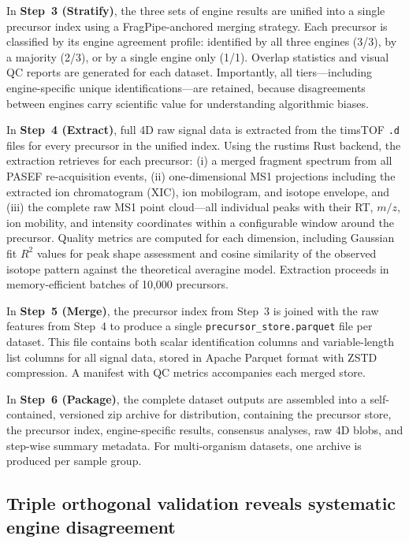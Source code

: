 \documentclass[10pt,twoside]{article}
\begin{document}
In \textbf{Step~3 (Stratify)}, the three sets of engine results are unified into a single precursor index using a FragPipe-anchored merging strategy.
Each precursor is classified by its engine agreement profile: identified by all three engines (3/3), by a majority (2/3), or by a single engine only (1/1).
Overlap statistics and visual QC reports are generated for each dataset.
Importantly, all tiers---including engine-specific unique identifications---are retained, because disagreements between engines carry scientific value for understanding algorithmic biases.

In \textbf{Step~4 (Extract)}, full 4D raw signal data is extracted from the timsTOF \texttt{.d} files for every precursor in the unified index.
Using the rustims Rust backend, the extraction retrieves for each precursor: (i) a merged fragment spectrum from all PASEF re-acquisition events, (ii) one-dimensional MS1 projections including the extracted ion chromatogram (XIC), ion mobilogram, and isotope envelope, and (iii) the complete raw MS1 point cloud---all individual peaks with their RT, $m/z$, ion mobility, and intensity coordinates within a configurable window around the precursor.
Quality metrics are computed for each dimension, including Gaussian fit $R^2$ values for peak shape assessment and cosine similarity of the observed isotope pattern against the theoretical averagine model.
Extraction proceeds in memory-efficient batches of 10,000 precursors.

In \textbf{Step~5 (Merge)}, the precursor index from Step~3 is joined with the raw features from Step~4 to produce a single \texttt{precursor\_store.parquet} file per dataset.
This file contains both scalar identification columns and variable-length list columns for all signal data, stored in Apache Parquet format with ZSTD compression.
A manifest with QC metrics accompanies each merged store.

In \textbf{Step~6 (Package)}, the complete dataset outputs are assembled into a self-contained, versioned zip archive for distribution, containing the precursor store, the precursor index, engine-specific results, consensus analyses, raw 4D blobs, and step-wise summary metadata.
For multi-organism datasets, one archive is produced per sample group.


\subsection*{Triple orthogonal validation reveals systematic engine disagreement}
\end{document}
